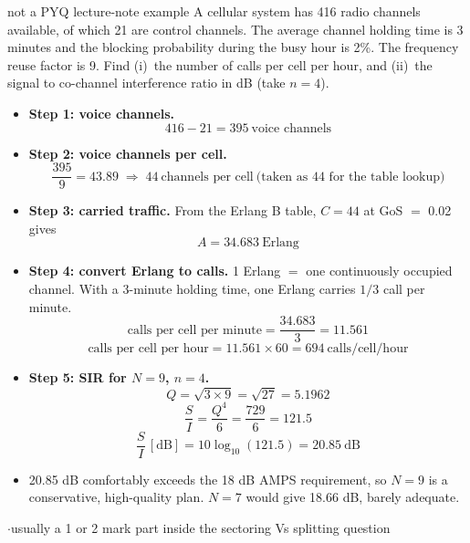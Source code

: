\hr

{\color{sub}\footnotesize {}}

\begin{asked}[PROBLEM]{not a PYQ \textperiodcentered{} lecture-note example \added}
A cellular system has 416 radio channels available, of which 21 are control channels. The
average channel holding time is 3 minutes and the blocking probability during the busy hour is
2\%. The frequency reuse factor is 9. Find (i)~the number of calls per cell per hour, and
(ii)~the signal to co-channel interference ratio in dB (take $n = 4$).
\end{asked}

\begin{itemize}
  \item \textbf{Step 1: voice channels.}
        \[ 416 - 21 = 395\ \text{voice channels} \]
  \item \textbf{Step 2: voice channels per cell.}
        \[ \frac{395}{9} = 43.89 \;\Rightarrow\; 44\ \text{channels per cell}
           \ \text{(taken as 44 for the table lookup)} \]
  \item \textbf{Step 3: carried traffic.}
        From the Erlang B table, $C = 44$ at GoS $=$ 0.02 gives
        \[ A = 34.683\ \text{Erlang} \]
  \item \textbf{Step 4: convert Erlang to calls.}
        1 Erlang $=$ one continuously occupied channel. With a 3-minute holding time, one
        Erlang carries $1/3$ call per minute.
        \[ \text{calls per cell per minute} = \frac{34.683}{3} = 11.561 \]
        \[ \text{calls per cell per hour} = 11.561 \times 60 = \boxed{694\ \text{calls/cell/hour}} \]
  \item \textbf{Step 5: SIR for $N = 9$, $n = 4$.}
        \[ Q = \sqrt{3 \times 9} = \sqrt{27} = 5.1962 \]
        \[ \frac{S}{I} = \frac{Q^4}{6} = \frac{729}{6} = 121.5 \]
        \[ \frac{S}{I}\,[\text{dB}] = 10\log_{10}(121.5) = \boxed{20.85\ \text{dB}} \]
  \item {} 20.85 dB comfortably exceeds the 18 dB AMPS requirement, so $N=9$ is a
        conservative, high-quality plan. $N=7$ would give 18.66 dB, barely adequate.
\end{itemize}

\hr

{\color{sub}\footnotesize {} 
\gap$\cdot$\gap usually a 1 or 2 mark part inside the sectoring Vs splitting question}

